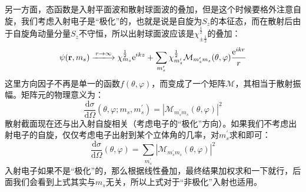 \documentclass[a4paper,zihao=-4,linespread=1]{ctexrep}
\begin{document}
	另一方面，态函数是入射平面波和散射球面波的叠加，但是这个时候要格外注意自旋，我们考虑入射电子是“极化”的，也就是说是自旋为$S_z$的本征态，而在散射后由于自旋角动量分量$S_z$不守恒，所以出射球面波应该是$\chi^{\frac{1}{2}}_{\pm\frac{1}{2}}$的叠加：
	\begin{equation}
		\label{eq:11.90}
		\psi(\mathbf{r},m_s)\xlongrightarrow{r\to \infty}\chi^\frac{1}{2}_{m_s}\mathrm{e}^{ikz}+\sum_{m_s^\prime}\chi^\frac{1}{2}_{m^\prime_s}\mathcal{M}_{m_s^\prime m_s}(\theta,\varphi)\frac{\mathrm{e}^{ikr}}{r}
	\end{equation}
	这里方向因子不再是单一的函数$f(\theta,\varphi)$，而变成了一个矩阵$\mathcal{M}$，其相当于散射振幅。矩阵元的物理意义为：
	\begin{equation}
		\frac{\mathrm{d}\sigma}{\mathrm{d}\Omega}(\theta,\varphi;m_s,m_s^\prime)=|\mathcal{M}_{m_s^\prime m_s}(\theta,\varphi)|^2
	\end{equation}
	散射截面现在还与出入射自旋相关（考虑电子的“极化”方向）。如果我们不考虑出射电子的自旋，仅仅考虑电子出射到某个立体角的几率，对$m_s^\prime $求和即可：
	\begin{equation}
		\frac{\mathrm{d}\sigma}{\mathrm{d}\Omega}(\theta,\varphi)=\sum_{m_s^\prime}|\mathcal{M}_{m_s^\prime m_s}(\theta,\varphi)|^2
	\end{equation}
	入射电子如果不是“极化”的，那么根据线性叠加，最终结果加权求和一下就行，后面我们会看到上式其实与$m_s$无关，所以上式对于“非极化”入射也适用。
	
\end{document}
